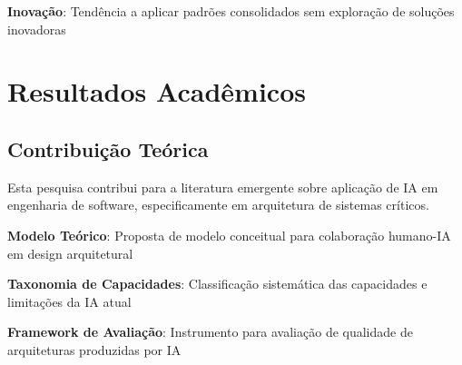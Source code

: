\textbf{Inovação}: Tendência a aplicar padrões consolidados sem exploração de soluções inovadoras

\section{Resultados Acadêmicos}

\subsection{Contribuição Teórica}

Esta pesquisa contribui para a literatura emergente sobre aplicação de IA em engenharia de software, especificamente em arquitetura de sistemas críticos.

\textbf{Modelo Teórico}: Proposta de modelo conceitual para colaboração humano-IA em design arquitetural

\textbf{Taxonomia de Capacidades}: Classificação sistemática das capacidades e limitações da IA atual

\textbf{Framework de Avaliação}: Instrumento para avaliação de qualidade de arquiteturas produzidas por IA



